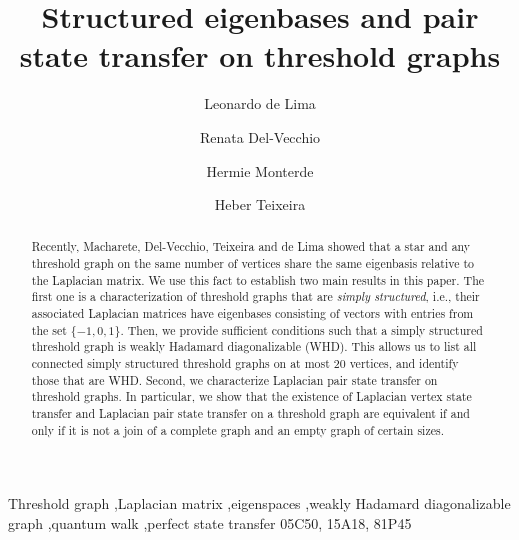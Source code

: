 \documentclass[preprint]{elsarticle}
\begin{document}

\begin{frontmatter}

\title{Structured eigenbases and pair state transfer on threshold graphs}

\author[heber,Leoaddress1]{Leonardo de Lima}

\author[renata]{Renata Del-Vecchio}

\author[HM]{Hermie Monterde}

\author[heber]{Heber Teixeira }

\address[heber]{Programa de Pós-Graduação em Matemática, Universidade Federal do Paraná, Paraná, Brasil}

\address[renata]{Instituto de Matemática e Estatística, Universidade Federal Fluminense, Niterói, Brasil}

\address[HM]{Department of Mathematics and Statistics, University of Regina, Regina, SK, Canada S4S 0A2}

\address[Leoaddress1]{Departamento de Administração Geral e Aplicada, Universidade Federal do Paraná, Paraná, Brasil}

\begin{abstract}
Recently, Macharete, Del-Vecchio, Teixeira and de Lima showed that a star and any threshold graph on the same number of vertices share the same eigenbasis relative to the Laplacian matrix. We use this fact to establish two main results in this paper. The first one is a characterization of threshold graphs that are \textit{simply structured}, i.e., their associated Laplacian matrices have eigenbases consisting of vectors with entries from the set $\{-1,0,1\}$. Then, we provide sufficient conditions such that a simply structured threshold graph is weakly Hadamard diagonalizable (WHD). This allows us to list all connected simply structured threshold graphs on at most 20 vertices, and identify those that are WHD. Second, we characterize Laplacian pair state transfer on threshold graphs. In particular, we show that the existence of Laplacian vertex state transfer and Laplacian pair state transfer on a threshold graph are equivalent if and only if it is not a join of a complete graph and an empty graph of certain sizes. 
\end{abstract}

\begin{keyword}
Threshold graph \sep Laplacian matrix \sep eigenspaces \sep weakly Hadamard diagonalizable graph \sep quantum walk \sep perfect state transfer
\MSC[2010] 05C50, 15A18, 81P45
\end{keyword}

\end{frontmatter}
\end{document}
